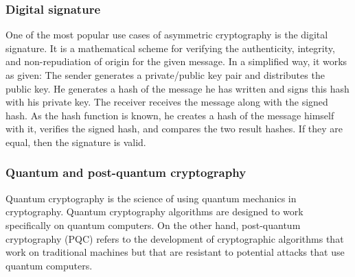 \subsubsection{Digital signature}
One of the most popular use cases of asymmetric cryptography is the digital signature. It is a mathematical scheme for verifying the authenticity, integrity, and non-repudiation of origin for the given message. In a simplified way, it works as given: The sender generates a private/public key pair and distributes the public key. He generates a hash of the message he has written and signs this hash with his private key. The receiver receives the message along with the signed hash. As the hash function is known, he creates a hash of the message himself with it, verifies the signed hash, and compares the two result hashes. If they are equal, then the signature is valid.

\subsubsection{Quantum and post-quantum cryptography}
Quantum cryptography is the science of using quantum mechanics in cryptography. Quantum cryptography algorithms are designed to work specifically on quantum computers.
On the other hand, post-quantum cryptography (PQC) refers to the development of cryptographic algorithms that work on traditional machines but that are resistant to potential attacks that use quantum computers.

